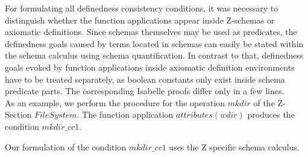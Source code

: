 For formulating all definedness consistency conditions, it was necessary to
distinguish whether the function applications appear inside Z-schemas or
axiomatic definitions. Since schemas themselves may be used as predicates, the
definedness goals caused by terms located in schemas can easily be stated within
the schema calculus using schema quantification. In contrast to that,
definedness goals evoked by function applications inside axiomatic definition
environments have to be treated separately, as boolean constants only exist
inside schema predicate parts. The corresponding Isabelle proofs differ only in a few lines. \\
As an example, we perform the procedure for the operation $mkdir$ of the
Z-Section $FileSystem$. The function
application $attributes(wdir)$ produces the condition $mkdir\_cc1$.\\
%

%
%
Our formulation of the condition $mkdir\_cc1$ uses the Z specific schema
calculus.\\

